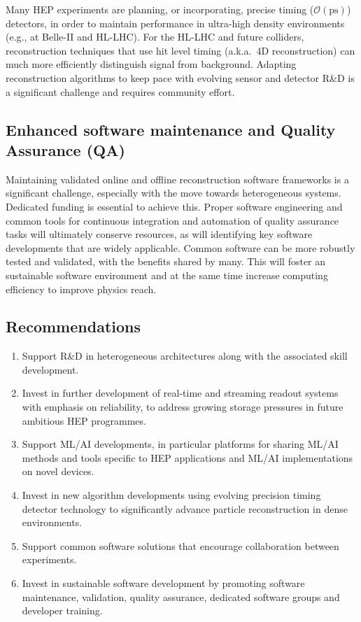 \documentclass[10pt,a4paper]{article}
\begin{document}
Many HEP experiments are planning, or incorporating, precise timing
($\mathcal{O}(\mathrm{ps})$) detectors, in order to maintain performance in
ultra-high density environments (e.g., at Belle-II and HL-LHC). For the HL-LHC
and future colliders, reconstruction techniques that use hit level timing
(a.k.a.~4D reconstruction) can much more efficiently distinguish signal from
background. Adapting reconstruction algorithms to keep pace with evolving sensor
and detector R\&D is a significant challenge and requires community effort.

\subsection{Enhanced software maintenance and Quality Assurance
(QA)}\label{enhanced-software-maintenance-and-quality-assurance-qa}

Maintaining validated online and offline reconstruction software frameworks is a
significant challenge, especially with the move towards heterogeneous systems.
Dedicated funding is essential to achieve this. Proper software engineering and
common tools for continuous integration and automation of quality assurance
tasks will ultimately conserve resources, as will identifying key software
developments that are widely applicable. Common software can be more robustly
tested and validated, with the benefits shared by many. This will foster an
sustainable software environment and at the same time increase computing
efficiency to improve physics reach.

\subsection{Recommendations}\label{recommendations-2}

\begin{enumerate}
\def\labelenumi{\arabic{enumi}.}
\item
  Support R\&D in heterogeneous architectures along with the associated
  skill development.
\item
  Invest in further development of real-time and streaming readout systems with
  emphasis on reliability, to address growing storage pressures in future
  ambitious HEP programmes.
\item
  Support ML/AI developments, in particular platforms for sharing ML/AI
  methods and tools specific to HEP applications and ML/AI
  implementations on novel devices.
\item
  Invest in new algorithm developments using evolving precision timing
  detector technology to significantly advance particle reconstruction
  in dense environments.
\item
  Support common software solutions that encourage collaboration between
  experiments.
\item
  Invest in sustainable software development by promoting software
  maintenance, validation, quality assurance, dedicated software groups
  and developer training.
\end{enumerate}
\end{document}
